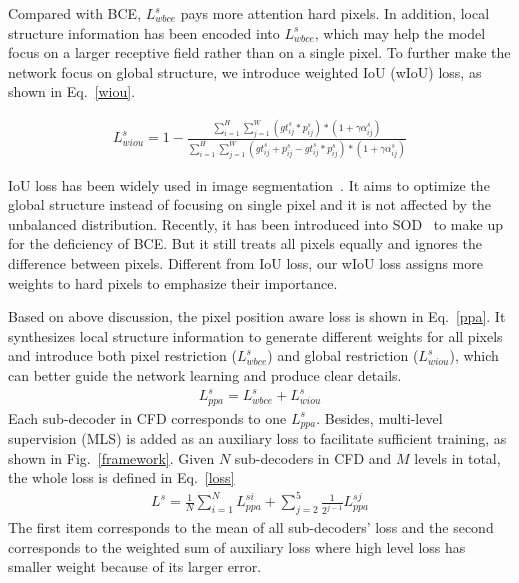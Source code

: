 \documentclass[letterpaper]{article} %
\begin{document}
Compared with BCE, $L^s_{wbce}$ pays more attention hard pixels. In addition, local structure information has been encoded into $L^s_{wbce}$, which may help the model focus on a larger receptive field rather than on a single pixel. To further make the network focus on global structure, we introduce weighted IoU (wIoU) loss, as shown in Eq.~\ref{wiou}.
\begin{small}
\begin{eqnarray}
  \label{wiou}
  L^s_{wiou} = 1-\frac{\sum\limits_{i=1}^H \sum\limits_{j=1}^W (gt_{ij}^s*p^s_{ij})*(1+\gamma\alpha_{ij}^s)}{\sum\limits_{i=1}^H \sum\limits_{j=1}^W (gt_{ij}^s+p^s_{ij}-gt_{ij}^s*p^s_{ij})*(1+\gamma\alpha_{ij}^s)}
\end{eqnarray}
\end{small}
IoU loss has been widely used in image segmentation~\cite{IOU}. It aims to optimize the global structure instead of focusing on single pixel and it is not affected by the unbalanced distribution. Recently, it has been introduced into SOD~\cite{BASNet} to make up for the deficiency of BCE. But it still treats all pixels equally and ignores the difference between pixels. Different from IoU loss, our wIoU loss assigns more weights to hard pixels to emphasize their importance. 

Based on above discussion, the pixel position aware loss is shown in Eq.~\ref{ppa}. It synthesizes local structure information to generate different weights for all pixels and introduce both pixel restriction ($L^s_{wbce}$) and global restriction ($L^s_{wiou}$), which can better guide the network learning and produce clear details.
\begin{eqnarray}
  \label{ppa}
  L^s_{ppa} = L^s_{wbce} + L^s_{wiou}
\end{eqnarray}
Each sub-decoder in CFD corresponds to one $L^s_{ppa}$. Besides, multi-level supervision (MLS) is added as an auxiliary loss to facilitate sufficient training, as shown in Fig.~\ref{framework}. Given $N$ sub-decoders in CFD and $M$ levels in total, the whole loss is defined in Eq.~\ref{loss}
\begin{eqnarray}
  \label{loss}
  L^s = \frac{1}{N}\sum_{i=1}^N L^{si}_{ppa}+\sum_{j=2}^5 \frac{1}{2^{j-1}} L^{sj}_{ppa}
\end{eqnarray}
The first item corresponds to the mean of all sub-decoders' loss and the second corresponds to the weighted sum of auxiliary loss where high level loss has smaller weight because of its larger error.
\end{document}
